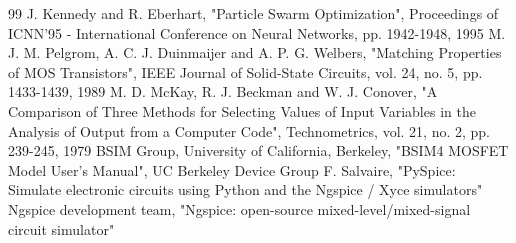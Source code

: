 \documentclass[conference]{IEEEtran}
\begin{document}
\begin{thebibliography}{99}
 J. Kennedy and R. Eberhart, "Particle Swarm Optimization", Proceedings of ICNN'95 - International Conference on Neural Networks, pp. 1942-1948, 1995
 M. J. M. Pelgrom, A. C. J. Duinmaijer and A. P. G. Welbers, "Matching Properties of MOS Transistors", IEEE Journal of Solid-State Circuits, vol. 24, no. 5, pp. 1433-1439, 1989
 M. D. McKay, R. J. Beckman and W. J. Conover, "A Comparison of Three Methods for Selecting Values of Input Variables in the Analysis of Output from a Computer Code", Technometrics, vol. 21, no. 2, pp. 239-245, 1979
 BSIM Group, University of California, Berkeley, "BSIM4 MOSFET Model User's Manual", UC Berkeley Device Group
 F. Salvaire, "PySpice: Simulate electronic circuits using Python and the Ngspice / Xyce simulators"
 Ngspice development team, "Ngspice: open-source mixed-level/mixed-signal circuit simulator"
\end{thebibliography}
\end{document}
